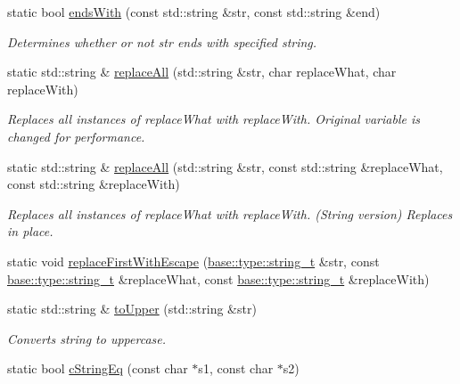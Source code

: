 \begin{DoxyCompactItemize}
static bool \hyperlink{classel_1_1base_1_1utils_1_1_str_a5bcf5f6cc41a7ed683be115148579561}{ends\+With} (const std\+::string \&str, const std\+::string \&end)
\begin{DoxyCompactList}\small\item\em Determines whether or not str ends with specified string. \end{DoxyCompactList}\item 
static std\+::string \& \hyperlink{classel_1_1base_1_1utils_1_1_str_aa07bfda259ed194120b371401734ae86}{replace\+All} (std\+::string \&str, char replace\+What, char replace\+With)
\begin{DoxyCompactList}\small\item\em Replaces all instances of replace\+What with \textquotesingle{}replace\+With\textquotesingle{}. Original variable is changed for performance. \end{DoxyCompactList}\item 
static std\+::string \& \hyperlink{classel_1_1base_1_1utils_1_1_str_a8e823aa60b160451ca0b8732c3c75568}{replace\+All} (std\+::string \&str, const std\+::string \&replace\+What, const std\+::string \&replace\+With)
\begin{DoxyCompactList}\small\item\em Replaces all instances of \textquotesingle{}replace\+What\textquotesingle{} with \textquotesingle{}replace\+With\textquotesingle{}. (String version) Replaces in place. \end{DoxyCompactList}\item 
static void \hyperlink{classel_1_1base_1_1utils_1_1_str_a3725349f601d07316d1c2bc211daaaa1}{replace\+First\+With\+Escape} (\hyperlink{namespaceel_1_1base_1_1type_a67e406cd213c231f1d135b5a4eda64b5}{base\+::type\+::string\+\_\+t} \&str, const \hyperlink{namespaceel_1_1base_1_1type_a67e406cd213c231f1d135b5a4eda64b5}{base\+::type\+::string\+\_\+t} \&replace\+What, const \hyperlink{namespaceel_1_1base_1_1type_a67e406cd213c231f1d135b5a4eda64b5}{base\+::type\+::string\+\_\+t} \&replace\+With)
\item 
static std\+::string \& \hyperlink{classel_1_1base_1_1utils_1_1_str_a6a05315fb967508dc1faf0584421a95d}{to\+Upper} (std\+::string \&str)
\begin{DoxyCompactList}\small\item\em Converts string to uppercase. \end{DoxyCompactList}\item 
static bool \hyperlink{classel_1_1base_1_1utils_1_1_str_a8081458c7848ff991d765c69f7858c44}{c\+String\+Eq} (const char $\ast$s1, const char $\ast$s2)

\end{DoxyCompactItemize}
